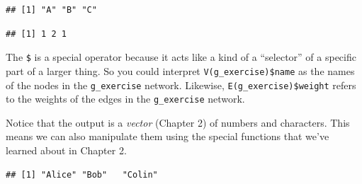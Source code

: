 \documentclass[
]{book}
\newenvironment{Shaded}{\begin{snugshade}}{\end{snugshade}}
\newcommand{\FunctionTok}[1]{\textcolor[rgb]{0.13,0.29,0.53}{\textbf{#1}}}
\newcommand{\NormalTok}[1]{#1}
\newcommand{\OtherTok}[1]{\textcolor[rgb]{0.56,0.35,0.01}{#1}}
\newcommand{\SpecialCharTok}[1]{\textcolor[rgb]{0.81,0.36,0.00}{\textbf{#1}}}
\newcommand{\StringTok}[1]{\textcolor[rgb]{0.31,0.60,0.02}{#1}}
\begin{document}
\begin{Shaded}
\end{Shaded}

\begin{verbatim}
## [1] "A" "B" "C"
\end{verbatim}

\begin{Shaded}
\end{Shaded}

\begin{verbatim}
## [1] 1 2 1
\end{verbatim}

The \texttt{\$} is a special operator because it acts like a kind of a ``selector'' of a specific part of a larger thing. So you could interpret \texttt{V(g\_exercise)\$name} as the names of the nodes in the \texttt{g\_exercise} network. Likewise, \texttt{E(g\_exercise)\$weight} refers to the weights of the edges in the \texttt{g\_exercise} network.

Notice that the output is a \emph{vector} (Chapter 2) of numbers and characters. This means we can also manipulate them using the special functions that we've learned about in Chapter 2.

\begin{Shaded}
\end{Shaded}

\begin{verbatim}
## [1] "Alice" "Bob"   "Colin"
\end{verbatim}
\end{document}
